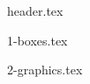 \documentclass[11pt, letterpaper]{sebaignacioo}
\begin{document}
  
  {header.tex}

  \tableofcontents
  
  \clearpage

  {1-boxes.tex}
  \clearpage

  {2-graphics.tex}
  \clearpage
\end{document}
